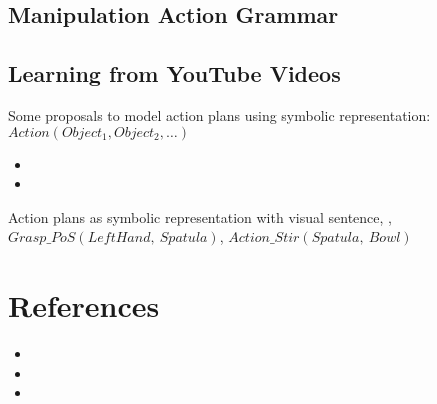 
\subsection{Manipulation Action Grammar}

\subsection{Learning from YouTube Videos}

Some proposals to model action plans using symbolic representation: $ Action(Object_1, Object_2, \dots) $
\begin{itemize}
	\item {}
	\item {}
\end{itemize}

Action plans as symbolic representation  with visual sentence, \eg, $Grasp\_PoS(LeftHand,\ Spatula)$, $Action\_Stir(Spatula,\ Bowl)$

\section{References}
\begin{itemize}
	\item {}
	\item {}
	\item {}
\end{itemize}